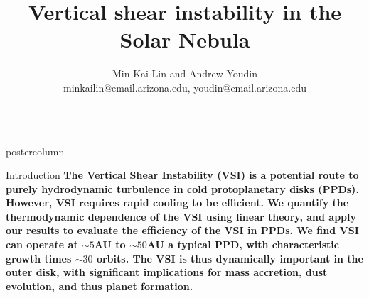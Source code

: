 \documentclass[final,hyperref={pdfpagelabels=false}]{beamer}
\title{{\huge Vertical shear instability in the Solar Nebula}}
\author{Min-Kai Lin and Andrew Youdin
  \\\vspace{1cm} \small{minkailin@email.arizona.edu, youdin@email.arizona.edu}}
\institute[UA]{Steward Observatory, 933 N Cherry Avenue,
  Tucson, AZ, 85721, USA}
\newlength{\columnheight}
\begin{document}
\captionsetup[subfigure]{labelformat=empty}

\begin{frame}
  \begin{columns}
    \begin{column}{.49\textwidth}
      \begin{beamercolorbox}[center,wd=\textwidth]{postercolumn}
        \begin{minipage}[T]{.95\textwidth}  %
          \parbox[t][\columnheight]{\textwidth}{ %
            \begin{block}{{\Large Introduction}}
              \justifying
              {\large              
                {\bf
                  The Vertical Shear Instability (VSI) is a potential
                  route to purely hydrodynamic turbulence in cold
                  protoplanetary disks (PPDs). However, VSI requires rapid
                  cooling to be efficient.  We quantify the
                  thermodynamic dependence of the VSI using linear
                  theory, and apply our results to evaluate the
                  efficiency of the VSI in PPDs. We find VSI can operate
                  at $\sim 5$AU to $\sim 50$AU a typical PPD, with
                  characteristic growth times $\sim 30$ orbits. The
                  VSI is thus dynamically important in the outer disk,
                  with significant implications for mass accretion,
                  dust evolution, and thus planet formation. 
                }
              }
            \end{block}
            \vfill
            
}
\end{minipage}
\end{beamercolorbox}
\end{column}
\end{columns}
\end{frame}
\end{document}
